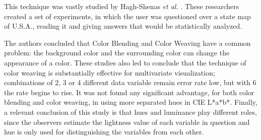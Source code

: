 This technique was vastly studied by Hagh-Shenas \emph{et al.} \cite{Hagh-Shenas2007}. These researchers created a
set of experiments, in which the user was questioned over a state map of U.S.A., reading it and giving answers
that would be statistically analyzed. \par
%
The authors concluded that Color Blending and Color Weaving have a common problem: the background color and the
surrounding color can change the appearance of a color. These studies also led to conclude that the technique
of color weaving is substantially effective for multivariate visualization; combinations of 2, 3 or 4 different
data variable remain error rate low, but with 6 the rate begins to rise. It was not found any significant advantage,
for both color blending and color weaving, in using more separated hues in CIE L*a*b*. Finally, a relevant conclusion of
this study is that hues and luminance play different roles, since the observers estimate the lightness
value of each variable in question and hue is only used for distinguishing the variables from each other.
%
